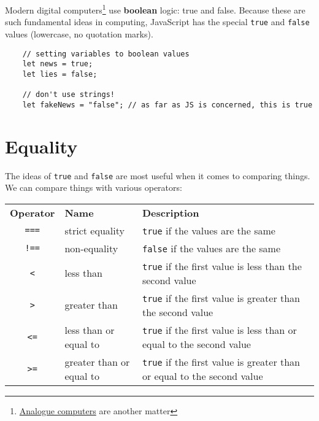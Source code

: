 
Modern digital computers\footnote{\href{https://en.wikipedia.org/wiki/Analog_computer}{Analogue computers} are another matter} use \textbf{boolean} logic: true and false. Because these are such fundamental ideas in computing, JavaScript has the special \texttt{true} and \texttt{false} values (lowercase, no quotation marks).

\begin{verbatim}
    // setting variables to boolean values
    let news = true;
    let lies = false;

    // don't use strings!
    let fakeNews = "false"; // as far as JS is concerned, this is true
\end{verbatim}

\pagebreak

\section{Equality}

The ideas of \texttt{true} and \texttt{false} are most useful when it comes to comparing things.
\\

We can compare things with various operators:
\\

\begin{small}
    \begin{tabu}{c l X}
        \textbf{Operator} & \textbf{Name} & \textbf{Description} \\
        \texttt{===} & strict equality & \texttt{true} if the values are the same \\
        \texttt{!==} & non-equality & \texttt{false} if the values are the same\\
        \texttt{<} & less than & \texttt{true} if the first value is less than the second value  \\
        \texttt{>} & greater than & \texttt{true} if the first value is greater than the second value\\
        \texttt{<=} & less than or equal to & \texttt{true} if the first value is less than or equal to the second value  \\
        \texttt{>=} & greater than or equal to & \texttt{true} if the first value is greater than or equal to the second value
    \end{tabu}
\end{small}

